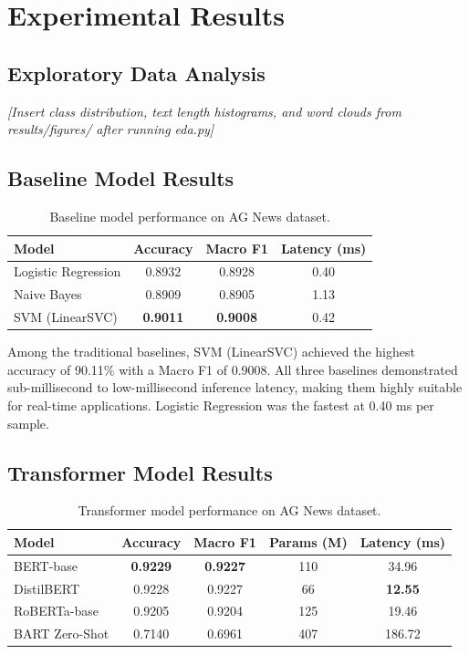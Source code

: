 \documentclass[12pt, a4paper]{article}
\begin{document}
\section{Experimental Results}

\subsection{Exploratory Data Analysis}
\textit{[Insert class distribution, text length histograms, and word clouds from results/figures/ after running eda.py]}

\subsection{Baseline Model Results}
\begin{table}[H]
    \centering
    \caption{Baseline model performance on AG News dataset.}
    \label{tab:baseline_ag}
    \begin{tabular}{lccc}
        \toprule
        \textbf{Model} & \textbf{Accuracy} & \textbf{Macro F1} & \textbf{Latency (ms)} \\
        \midrule
        Logistic Regression & 0.8932 & 0.8928 & 0.40 \\
        Naive Bayes & 0.8909 & 0.8905 & 1.13 \\
        SVM (LinearSVC) & \textbf{0.9011} & \textbf{0.9008} & 0.42 \\
        \bottomrule
    \end{tabular}
\end{table}

Among the traditional baselines, SVM (LinearSVC) achieved the highest accuracy of 90.11\% with a Macro F1 of 0.9008. All three baselines demonstrated sub-millisecond to low-millisecond inference latency, making them highly suitable for real-time applications. Logistic Regression was the fastest at 0.40 ms per sample.


\subsection{Transformer Model Results}
\begin{table}[H]
    \centering
    \caption{Transformer model performance on AG News dataset.}
    \label{tab:transformer_ag}
    \begin{tabular}{lcccc}
        \toprule
        \textbf{Model} & \textbf{Accuracy} & \textbf{Macro F1} & \textbf{Params (M)} & \textbf{Latency (ms)} \\
        \midrule
        BERT-base & \textbf{0.9229} & \textbf{0.9227} & 110 & 34.96 \\
        DistilBERT & 0.9228 & 0.9227 & 66 & \textbf{12.55} \\
        RoBERTa-base & 0.9205 & 0.9204 & 125 & 19.46 \\
        BART Zero-Shot & 0.7140 & 0.6961 & 407 & 186.72 \\
        \bottomrule
    \end{tabular}
\end{table}
\end{document}
